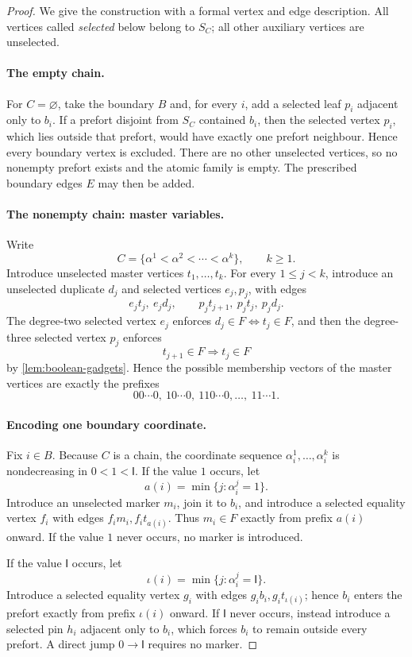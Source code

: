 \documentclass[11pt,reqno]{amsart}
\theoremstyle{definition}
\begin{document}
\begin{proof}
We give the construction with a formal vertex and edge description.  All
vertices called \emph{selected} below belong to $S_C$; all other auxiliary
vertices are unselected.

\paragraph{The empty chain.}
For $C=\varnothing$, take the boundary $B$ and, for every $i$, add a selected
leaf $p_i$ adjacent only to $b_i$.  If a prefort disjoint from $S_C$ contained
$b_i$, then the selected vertex $p_i$, which lies outside that prefort, would
have exactly one prefort neighbour.  Hence every boundary vertex is excluded.
There are no other unselected vertices, so no nonempty prefort exists and the
atomic family is empty.  The prescribed boundary edges $E$ may then be added.

\paragraph{The nonempty chain: master variables.}
Write
\[
 C=\{\alpha^1<\alpha^2<\cdots<\alpha^k\},\qquad k\ge1.
\]
Introduce unselected master vertices $t_1,\ldots,t_k$.  For every
$1\le j<k$, introduce an unselected duplicate $d_j$ and selected vertices
$e_j,p_j$, with edges
\[
 e_jt_j,\ e_jd_j,
 \qquad
 p_jt_{j+1},\ p_jt_j,\ p_jd_j.
\]
The degree-two selected vertex $e_j$ enforces
$d_j\in F\Longleftrightarrow t_j\in F$, and then the degree-three selected
vertex $p_j$ enforces
\[
 t_{j+1}\in F\Longrightarrow t_j\in F
\]
by \cref{lem:boolean-gadgets}.  Hence the possible membership vectors of the
master vertices are exactly the prefixes
\[
 00\cdots0,\ 10\cdots0,\ 110\cdots0,\ldots,\ 11\cdots1.
\]

\paragraph{Encoding one boundary coordinate.}
Fix $i\in B$.  Because $C$ is a chain, the coordinate sequence
$\alpha_i^1,\ldots,\alpha_i^k$ is nondecreasing in
$0<1<\mathsf I$.  If the value $1$ occurs, let
\[
 a(i)=\min\{j:\alpha_i^j=1\}.
\]
Introduce an unselected marker $m_i$, join it to $b_i$, and introduce a
selected equality vertex $f_i$ with edges $f_im_i,f_it_{a(i)}$.  Thus
$m_i\in F$ exactly from prefix $a(i)$ onward.  If the value $1$ never occurs,
no marker is introduced.

If the value $\mathsf I$ occurs, let
\[
 \iota(i)=\min\{j:\alpha_i^j=\mathsf I\}.
\]
Introduce a selected equality vertex $g_i$ with edges
$g_ib_i,g_it_{\iota(i)}$; hence $b_i$ enters the prefort exactly from prefix
$\iota(i)$ onward.  If $\mathsf I$ never occurs, instead introduce a selected
pin $h_i$ adjacent only to $b_i$, which forces $b_i$ to remain outside every
prefort.  A direct jump $0\to\mathsf I$ requires no marker.


\end{proof}
\end{document}
